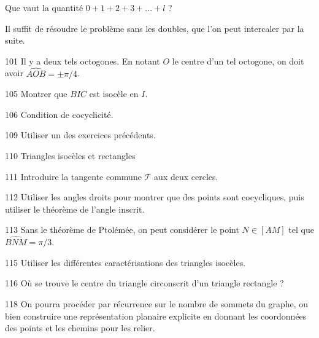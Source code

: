 \begin{Hint}{93}
Que vaut la quantité $0+1+2+3+...+l$ ?
\end{Hint}
\begin{Hint}{99}
Il suffit de résoudre le problème sans les doubles, que l'on peut intercaler par la suite.

\end{Hint}
\begin{Hint}{101}
Il y a deux tels octogones. En notant $O$ le centre d'un tel octogone, on doit avoir $\widehat{AOB}=\pm \pi/4$.
\end{Hint}
\begin{Hint}{105}
Montrer que $BIC$ est isocèle en $I$.
\end{Hint}
\begin{Hint}{106}
Condition de cocyclicité.
\end{Hint}
\begin{Hint}{109}
Utiliser un des exercices précédents.%
\end{Hint}
\begin{Hint}{110}
Triangles isocèles et rectangles
\end{Hint}
\begin{Hint}{111}
Introduire la tangente commune $\mathcal T$ aux deux cercles.
\end{Hint}
\begin{Hint}{112}
Utiliser les angles droits pour montrer que des points sont cocycliques, puis utiliser le théorème de l'angle inscrit.
\end{Hint}
\begin{Hint}{113}
Sans le théorème de Ptolémée, on peut considérer le point $N \in [AM]$ tel que $\widehat{BNM}=\pi/3$.
\end{Hint}
\begin{Hint}{115}
Utiliser les différentes caractérisations des triangles isocèles.
\end{Hint}
\begin{Hint}{116}
Où se trouve le centre du triangle circonscrit d'un triangle rectangle ?
\end{Hint}
\begin{Hint}{118}
On pourra procéder par récurrence sur le nombre de sommets du graphe, ou bien construire une représentation planaire explicite en donnant les coordonnées des points et les chemins pour les relier.
\end{Hint}
